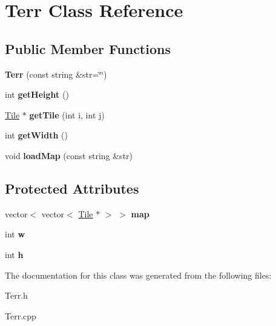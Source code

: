 \hypertarget{class_terr}{}\section{Terr Class Reference}
\label{class_terr}
\subsection*{Public Member Functions}
\begin{DoxyCompactItemize}
\item 
{\bfseries Terr} (const string \&str=\char`\"{}\char`\"{})\hypertarget{class_terr_a947a7229cb37a0e87d340f6b88f46994}{}\label{class_terr_a947a7229cb37a0e87d340f6b88f46994}

\item 
int {\bfseries get\+Height} ()\hypertarget{class_terr_a0ef7c8147e12a2291fc84d9ebc67a8df}{}\label{class_terr_a0ef7c8147e12a2291fc84d9ebc67a8df}

\item 
\hyperlink{class_tile}{Tile} $\ast$ {\bfseries get\+Tile} (int i, int j)\hypertarget{class_terr_a1ca3548cb10880ae8ac01362d1f3116a}{}\label{class_terr_a1ca3548cb10880ae8ac01362d1f3116a}

\item 
int {\bfseries get\+Width} ()\hypertarget{class_terr_a397fdbbeb3fe3eb8989d9da77af42f57}{}\label{class_terr_a397fdbbeb3fe3eb8989d9da77af42f57}

\item 
void {\bfseries load\+Map} (const string \&str)\hypertarget{class_terr_af53f4fdf0e1605b1536bde8c3fb77c9d}{}\label{class_terr_af53f4fdf0e1605b1536bde8c3fb77c9d}

\end{DoxyCompactItemize}
\subsection*{Protected Attributes}
\begin{DoxyCompactItemize}
\item 
vector$<$ vector$<$ \hyperlink{class_tile}{Tile} $\ast$ $>$ $>$ {\bfseries map}\hypertarget{class_terr_a35de374972704b3d92e76b4bc8e67a9c}{}\label{class_terr_a35de374972704b3d92e76b4bc8e67a9c}

\item 
int {\bfseries w}\hypertarget{class_terr_af1d43d8b2b20b19d005626831c1335fb}{}\label{class_terr_af1d43d8b2b20b19d005626831c1335fb}

\item 
int {\bfseries h}\hypertarget{class_terr_aa2f06b09cb8abd0fda4abb2b696f6885}{}\label{class_terr_aa2f06b09cb8abd0fda4abb2b696f6885}

\end{DoxyCompactItemize}


The documentation for this class was generated from the following files\+:\begin{DoxyCompactItemize}
\item 
Terr.\+h\item 
Terr.\+cpp\end{DoxyCompactItemize}
